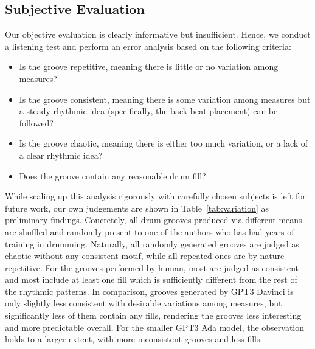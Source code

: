 \documentclass[letterpaper]{article} %
\begin{document}
\subsection{Subjective Evaluation}
Our objective evaluation is clearly informative but insufficient. Hence, we conduct a listening test and perform an error analysis based on the following criteria:
\begin{itemize}
    \item Is the groove repetitive, meaning there is little or no variation among measures?
    \item Is the groove consistent, meaning there is some variation among measures but a steady rhythmic idea (specifically, the back-beat placement) can be followed?
    \item Is the groove chaotic, meaning there is either too much variation, or a lack of a clear rhythmic idea?
    \item Does the groove contain any reasonable drum fill?
\end{itemize}

While scaling up this analysis rigorously with carefully chosen subjects is left for future work, our own judgements are shown in Table~\ref{tab:variation} as preliminary findings. Concretely, all drum grooves produced via different means are shuffled and randomly present to one of the authors who has had years of training in drumming. Naturally, all randomly generated grooves are judged as chaotic without any consistent motif, while all repeated ones are by nature repetitive. For the grooves performed by human, most are judged as consistent and most include at least one fill which is sufficiently different from the rest of the rhythmic patterns. In comparison, grooves generated by GPT3 Davinci is only slightly less consistent with desirable variations among measures, but significantly less of them contain any fills, rendering the grooves less interesting and more predictable overall. For the smaller GPT3 Ada model, the observation holds to a larger extent, with more inconsistent grooves and less fills.
\end{document}
